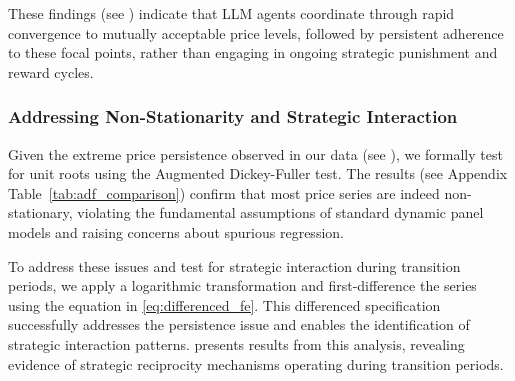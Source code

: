 These findings (see ) indicate that LLM agents coordinate through rapid convergence to mutually acceptable price levels, followed by persistent adherence to these focal points, rather than engaging in ongoing strategic punishment and reward cycles.

\subsubsection*{Addressing Non-Stationarity and Strategic Interaction}

Given the extreme price persistence observed in our data (see ), we formally test for unit roots using the Augmented Dickey-Fuller test. The results (see Appendix Table~\ref{tab:adf_comparison}) confirm that most price series are indeed non-stationary, violating the fundamental assumptions of standard dynamic panel models and raising concerns about spurious regression.

To address these issues and test for strategic interaction during transition periods, we apply a logarithmic transformation and first-difference the series using the equation in \eqref{eq:differenced_fe}. This differenced specification successfully addresses the persistence issue and enables the identification of strategic interaction patterns.  presents results from this analysis, revealing evidence of strategic reciprocity mechanisms operating during transition periods.

